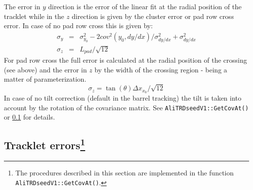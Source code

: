 \documentclass{alicetdr}
\begin{document}
The error in $y$ direction is the error of the linear fit at the radial 
position of the tracklet while in the $z$ direction is given by the cluster 
error or pad row cross error. In case of no pad row cross this is given by:
\begin{eqnarray}
\sigma_{y} &=& \sigma^{2}_{y_{0}} - 2cov^{2}(y_{0}, dy/dx)/\sigma^{2}_{dy/dx} 
            + \sigma^{2}_{dy/dx}\\
\sigma_{z} &=& L_{pad}/\sqrt{12}
\end{eqnarray}
For pad row cross the full error is calculated at the radial position of the 
crossing (see above) and the error in $z$ by the width of the crossing region - 
being a matter of parameterization. 
\begin{equation}
\sigma_{z} = \tan(\theta) \Delta x_{x_{0}}/\sqrt{12}
\end{equation}
In case of no tilt correction (default in the barrel tracking) the tilt is 
taken into account by the rotation of the covariance matrix. See 
{\tt AliTRDseedV1::GetCovAt()} or \ref{REC:Tracking:TrackletErrors} for details.

\subsection[Tracklet errors]{Tracklet errors\footnote{The procedures described in this 
section are implemented in the function 
{\tt AliTRDseedV1::GetCovAt()}.}}\label{REC:Tracking:TrackletErrors}
\end{document}
